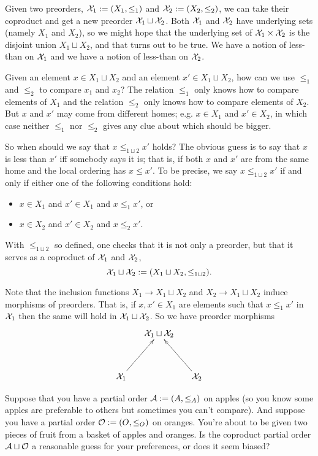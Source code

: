 \documentclass[CT4S-EN-RU]{subfiles}
\begin{document}
\begin{exampleENG}
Given two preorders, $\mathcal{X}_1:=(X_1,\leq_1)$ and $\mathcal{X}_2:=(X_2,\leq_2)$, we can take their coproduct and get a new preorder $\mathcal{X}_1\sqcup\mathcal{X}_2$. Both $\mathcal{X}_1$ and $\mathcal{X}_2$ have underlying sets (namely $X_1$ and $X_2$), so we might hope that the underlying set of $\mathcal{X}_1\times\mathcal{X}_2$ is the disjoint union $X_1\sqcup X_2$, and that turns out to be true. We have a notion of less-than on $\mathcal{X}_1$ and we have a notion of less-than on $\mathcal{X}_2$. 

Given an element $x\in X_1\sqcup X_2$ and an element $x'\in X_1\sqcup X_2$, how can we use $\leq_1$ and $\leq_2$ to compare $x_1$ and $x_2$? The relation $\leq_1$ only knows how to compare elements of $X_1$ and the relation $\leq_2$ only knows how to compare elements of $X_2$. But $x$ and $x'$ may come from different homes; e.g. $x\in X_1$ and $x'\in X_2$, in which case neither $\leq_1$ nor $\leq_2$ gives any clue about which should be bigger. 

So when should we say that $x\leq_{1\sqcup 2} x'$ holds? The obvious guess is to say that $x$ is less than $x'$ iff somebody says it is; that is, if both $x$ and $x'$ are from the same home and the local ordering has $x\leq x'$. To be precise, we say $x\leq_{1\sqcup 2}x'$ if and only if either one of the following conditions hold:
\begin{itemize}
\item $x\in X_1$ and $x'\in X_1$ and $x\leq_1x'$, or
\item $x\in X_2$ and $x'\in X_2$ and $x\leq_2x'$.
\end{itemize}
With $\leq_{1\sqcup 2}$ so defined, one checks that it is not only a preorder, but that it serves as a coproduct of $\mathcal{X}_1$ and $\mathcal{X}_2$, 
$$\mathcal{X}_1\sqcup\mathcal{X}_2:=(X_1\sqcup X_2,\leq_{1\sqcup 2}).$$

Note that the inclusion functions $X_1\to X_1\sqcup X_2$ and $X_2\to X_1\sqcup X_2$ induce morphisms of preorders. That is, if $x,x'\in X_1$ are elements such that $x\leq_1x'$ in $\mathcal{X}_1$ then the same will hold in $\mathcal{X}_1\sqcup\mathcal{X}_2$. So we have preorder morphisms
$$\xymatrix@=15pt{&\mcX_1\sqcup\mcX_2\\\\\mcX_1\ar[ruu]&&\mcX_2\ar[luu]}$$
\end{exampleENG}

\begin{exampleRUS}
\end{exampleRUS}

\begin{exerciseENG}
Suppose that you have a partial order $\mathcal{A}:=(A,\leq_A)$ on apples (so you know some apples are preferable to others but sometimes you can't compare). And suppose you have a partial order $\mathcal{O}:=(O,\leq_O)$ on oranges. You're about to be given two pieces of fruit from a basket of apples and oranges. Is the coproduct partial order $\mathcal{A}\sqcup\mathcal{O}$ a reasonable guess for your preferences, or does it seem biased?
\end{exerciseENG}
\end{document}
